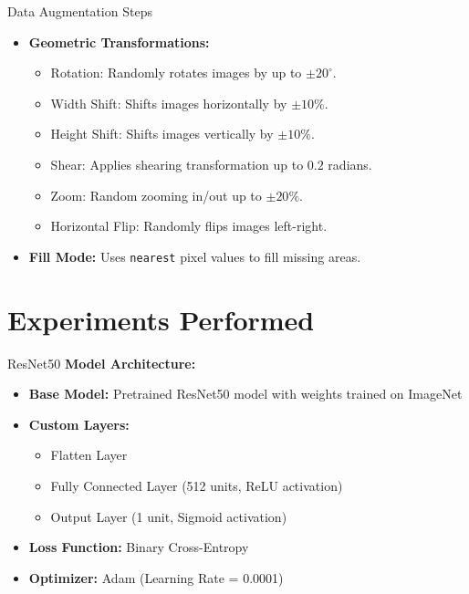 \documentclass{beamer}
\begin{document}
\begin{frame}{Data Augmentation Steps}
    \begin{itemize}
        \item \textbf{Geometric Transformations:}
        \begin{itemize}
            \item Rotation: Randomly rotates images by up to \( \pm20^\circ \).
            \item Width Shift: Shifts images horizontally by \( \pm10\% \).
            \item Height Shift: Shifts images vertically by \( \pm10\% \).
            \item Shear: Applies shearing transformation up to \( 0.2 \) radians.
            \item Zoom: Random zooming in/out up to \( \pm20\% \).
            \item Horizontal Flip: Randomly flips images left-right.
        \end{itemize}
        \item \textbf{Fill Mode:} Uses \texttt{nearest} pixel values to fill missing areas.
    \end{itemize}
\end{frame}

\section{Experiments Performed}

\begin{frame}{ResNet50}
    \textbf{Model Architecture:}
    \begin{itemize}
        \item \textbf{Base Model:} Pretrained ResNet50 model with weights trained on ImageNet
        \item \textbf{Custom Layers:}
        \begin{itemize}
            \item Flatten Layer
            \item Fully Connected Layer (512 units, ReLU activation)
            \item Output Layer (1 unit, Sigmoid activation)
        \end{itemize}
        \item \textbf{Loss Function:} Binary Cross-Entropy
        \item \textbf{Optimizer:} Adam (Learning Rate = 0.0001)
    \end{itemize}
\end{frame}
\end{document}
